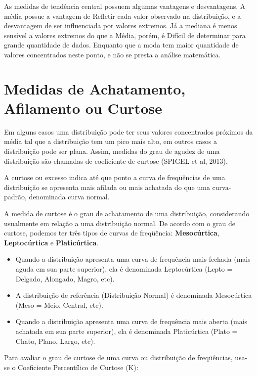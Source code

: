As medidas de tendência  central possuem algumas vantagens e desvantagens. A média possue a vantagem de Refletir cada valor observado na distribuição, e a desvantagem de ser influenciada por valores extremos. Já a mediana é menos sensível a valores extremos do que a Média, porém, é Difícil de determinar para grande quantidade de dados. Enquanto que a moda tem maior quantidade de valores concentrados neste ponto, e não se presta a análise matemática.






 
\newpage 

\section{Medidas de Achatamento, Afilamento ou Curtose }

Em alguns casos uma distribuição pode ter seus valores concentrados próximos da média tal que a distribuição tem um pico mais alto, em outros casos a distribuição pode ser plana. Assim, medidas do grau de agudez de uma distribuição são chamadas de coeficiente de curtose (SPIGEL et al, 2013). \vskip0.3cm

A curtose ou excesso indica até que ponto a curva de freqüências de uma distribuição se apresenta mais afilada ou mais achatada do que uma curva-padrão, denominada curva normal.\vskip0.3cm

A medida de curtose é o grau de achatamento de uma distribuição, considerando usualmente em relação a uma distribuição normal. De acordo com o grau de curtose, podemos ter três tipos de curvas de freqüência: \textbf{Mesocúrtica}, \textbf{Leptocúrtica} e \textbf{Platicúrtica}.\vskip0.3cm

\begin{itemize}
\item Quando a distribuição apresenta uma curva de frequência mais fechada (mais aguda em sua parte superior), ela é denominada Leptocúrtica (Lepto = Delgado, Alongado, Magro, etc).
\item A distribuição de referência (Distribuição Normal) é denominada Mesocúrtica (Meso = Meio, Central, etc).
\item Quando a distribuição apresenta uma curva de frequência mais aberta (mais achatada em sua parte superior), ela é denominada Platicúrtica (Plato = Chato, Plano, Largo, etc).
\end{itemize}

Para avaliar o grau de curtose de uma curva ou distribuição de freqüências, usa-se o Coeficiente Percentílico de Curtose (K):

